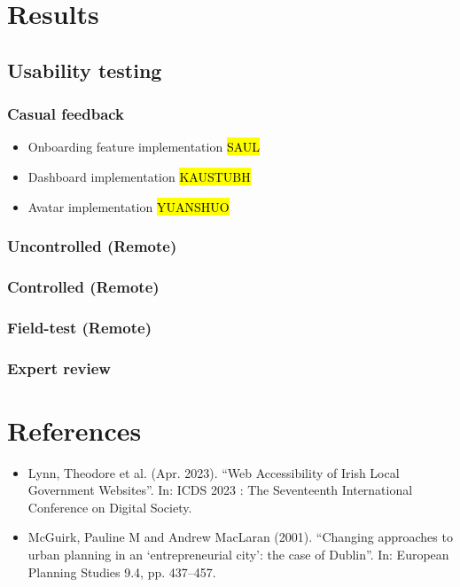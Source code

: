 \documentclass{report}
\begin{document}
\chapter{Results}
\section{Usability testing}
\subsection{Casual feedback}
\begin{itemize}
    \item Onboarding feature implementation \hl{SAUL}
    \item Dashboard implementation \hl{KAUSTUBH}
    \item Avatar implementation \hl{YUANSHUO}
\end{itemize}
\subsection{Uncontrolled (Remote)}
\subsection{Controlled (Remote)}
\subsection{Field-test (Remote)}
\subsection{Expert review}


\newpage
{}
\chapter*{References}
\begin{itemize}
    \item Lynn, Theodore et al. (Apr. 2023). “Web Accessibility of Irish Local Government Websites”. In: ICDS 2023 : The
          Seventeenth International Conference on Digital Society.
    \item McGuirk, Pauline M and Andrew MacLaran (2001). “Changing approaches to urban planning in an ‘entrepreneurial
          city’: the case of Dublin”. In: European Planning Studies 9.4, pp. 437–457.
\end{itemize}

\newpage
{}
\listoffigures
\end{document}
